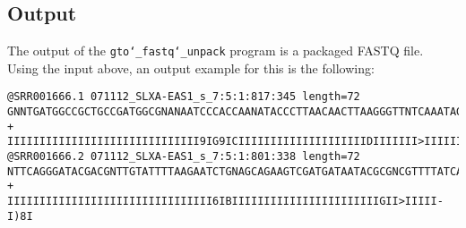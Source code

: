 \subsection*{Output}
The output of the \texttt{gto\char`_fastq\char`_unpack} program is a packaged FASTQ file.\\
Using the input above, an output example for this is the following:
\begin{lstlisting}
@SRR001666.1 071112_SLXA-EAS1_s_7:5:1:817:345 length=72
GNNTGATGGCCGCTGCCGATGGCGNANAATCCCACCAANATACCCTTAACAACTTAAGGGTTNTCAAATAGA
+
IIIIIIIIIIIIIIIIIIIIIIIIIIIIII9IG9ICIIIIIIIIIIIIIIIIIIIIDIIIIIII>IIIIII/
@SRR001666.2 071112_SLXA-EAS1_s_7:5:1:801:338 length=72
NTTCAGGGATACGACGNTTGTATTTTAAGAATCTGNAGCAGAAGTCGATGATAATACGCGNCGTTTTATCAN
+
IIIIIIIIIIIIIIIIIIIIIIIIIIIIIIII6IBIIIIIIIIIIIIIIIIIIIIIIIGII>IIIII-I)8I
\end{lstlisting}
